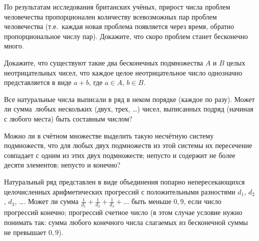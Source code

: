 \documentclass[a4paper,11pt]{article}
\begin{document}


По результатам исследования британских учёных, прирост числа проблем человечества пропорционален количеству всевозможных пар проблем человечества
(т.е.~каждая новая проблема появляется через время, обратно пропорциональное числу пар). Докажите, что скоро проблем станет бесконечно много.


Докажите, что существуют такие два бесконечных
подмножества $A$ и $B$ целых неотрицательных чисел,
что каждое целое неотрицательное число %
однозначно представляется в виде $a+b$, где $a\in A$,
$b\in B$.

Все натуральные числа выписали в ряд в неком порядке
(каждое по разу).
Может ли сумма~любых нескольких (двух,
трех, \dots) чисел,
выписанных подряд (начиная с любого места) быть составным числом?






 Можно ли в сч\"етном множестве выделить такую несч\"етную систему
подмножеств, что для любых двух подмножеств из этой системы
их пересечение
 совпадает с одним из этих двух подмножеств;
 непусто и содержит не более десяти элементов; 
непусто и конечно? 


Натуральный ряд представлен в виде объединения %
попарно непересекающихся целочисленных %
арифметических
прогрессий с положительными разностями $d_1$, $d_2$, $d_3$, \dots.
Может ли сумма
$\frac1{d_1} + \frac1{d_2} + \frac1{d_3}+\dots$ быть меньше $0,9$, если
число прогрессий конечно;
прогрессий счетное число (в этом случае условие нужно понимать
так: сумма любого конечного числа слагаемых из бесконечной
суммы не превышает $0,9$).




\end{document}
